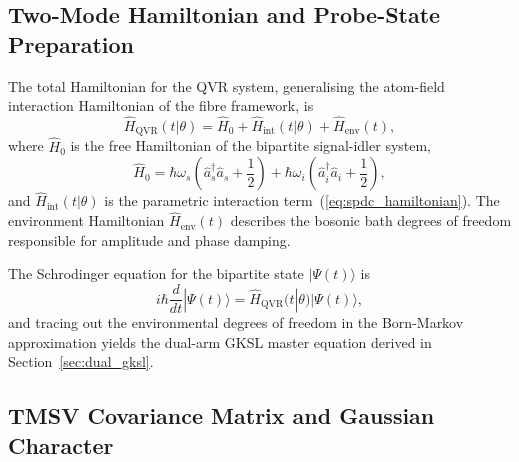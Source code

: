 \documentclass[journal]{IEEEtran}
\begin{document}
\subsection{Two-Mode Hamiltonian and Probe-State Preparation}

The total Hamiltonian for the QVR system, generalising the atom-field interaction Hamiltonian of the fibre framework, is
\begin{equation}\label{eq:total_hamiltonian}
\hat{H}_{\text{QVR}}(t|\theta) = \hat{H}_0 + \hat{H}_{\text{int}}(t|\theta) + \hat{H}_{\text{env}}(t),
\end{equation}
where $\hat{H}_0$ is the free Hamiltonian of the bipartite signal-idler system,
\begin{equation}\label{eq:free_hamiltonian}
\hat{H}_0 = \hbar\omega_s\left(\hat{a}_s^\dagger\hat{a}_s + \frac{1}{2}\right) + \hbar\omega_i\left(\hat{a}_i^\dagger\hat{a}_i + \frac{1}{2}\right),
\end{equation}
and $\hat{H}_{\text{int}}(t|\theta)$ is the parametric interaction term~(\ref{eq:spdc_hamiltonian}). The environment Hamiltonian $\hat{H}_{\text{env}}(t)$ describes the bosonic bath degrees of freedom responsible for amplitude and phase damping.

The Schrodinger equation for the bipartite state $|\Psi(t)\rangle$ is
\begin{equation}\label{eq:schrodinger_bipartite}
i\hbar\frac{d}{dt}|\Psi(t)\rangle = \hat{H}_{\text{QVR}}(t|\theta) |\Psi(t)\rangle,
\end{equation}
and tracing out the environmental degrees of freedom in the Born-Markov approximation yields the dual-arm GKSL master equation derived in Section~\ref{sec:dual_gksl}.

\subsection{TMSV Covariance Matrix and Gaussian Character}
\end{document}
